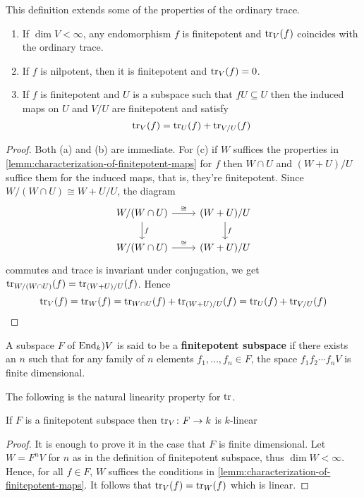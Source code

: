 This definition extends some of the properties of the ordinary trace.
\begin{lemma}\label{lemm:properties-trace}
	\begin{enumerate}[label = (\alph*)]
		\item If $\dim V < \infty$, any endomorphism $f$ is finitepotent and $\operatorname{tr}_{V}(f)$ coincides with the ordinary trace.
		\item If $f$ is nilpotent, then it is finitepotent and $\operatorname{tr}_{V}(f) = 0$.
		\item If $f$ is finitepotent and $U$ is a subspace such that $f U \subseteq U$ then the induced maps on $U$ and $V/U$ are finitepotent and satisfy
		\[
		 	\operatorname{tr}_{V}(f) = \operatorname{tr}_{U}(f) + \operatorname{tr}_{V/U}(f)
		 \] 
	\end{enumerate}
\end{lemma}
\begin{proof}
	Both (a) and (b) are immediate. For (c) if $W$ suffices the properties in \cref{lemm:characterization-of-finitepotent-maps} for $f$ then $W\cap U$ and $(W + U)/U$ suffice them for the induced maps, that is, they're finitepotent. Since $W/(W\cap U) \cong W+U/U$, the diagram
	\[
		\begin{tikzcd}
			W/(W\cap U) \arrow[r, "\cong"] \arrow[d, "f"] & (W+U)/U \arrow[d, "f"] \\
			W/(W\cap U) \arrow[r, "\cong"] & (W+U)/U
		\end{tikzcd}
	\]
	commutes and trace is invariant under conjugation, we get $\operatorname{tr}_{W/(W\cap U)}(f) = \operatorname{tr}_{(W+U)/U}(f)$. Hence
	\[
	 	\operatorname{tr}_{V}(f) = \operatorname{tr}_{W}(f) = \operatorname{tr}_{W\cap U}(f) + \operatorname{tr}_{(W+U)/U}(f) = \operatorname{tr}_{U}(f) + \operatorname{tr}_{V/U}(f)
	\]
\end{proof}
\begin{definition}\label{def:finitepotent subspace}
	A subspace $F$ of $\operatorname{End}_{k})V$ is said to be a \textbf{finitepotent subspace} if there exists an $n$ such that for any family of $n$ elements $f_{1}, \ldots, f_{n}\in F$, the space $f_{1}f_{2}\cdots f_{n}V$ is finite dimensional.
\end{definition}
The following is the natural linearity property for $\operatorname{tr}$.
\begin{proposition}\label{prop:linearity-trace}
	If $F$ is a finitepotent subspace then $\operatorname{tr}_{V}\colon F\to k$ is $k$-linear
\end{proposition}
\begin{proof}
	It is enough to prove it in the case that $F$ is finite dimensional. Let $W = F^{n}V$ for $n$ as in the definition of finitepotent subspace, thus $\dim W < \infty$. Hence, for all $f\in F$, $W$ suffices the conditions in \cref{lemm:characterization-of-finitepotent-maps}. It follows that $\operatorname{tr}_{V}(f) = \operatorname{tr}_{W}(f)$ which is linear.
\end{proof}
